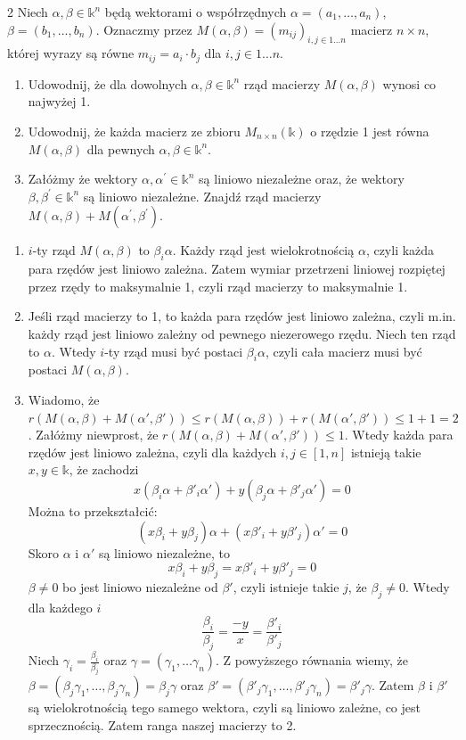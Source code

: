 \documentclass{../note}
\begin{document}
\begin{zadanie}{2}
    Niech $\alpha,\beta\in\mathbb{k}^{n}$ będą wektorami o współrzędnych $\alpha=(a_{1},\dots,a_{n})$, $\beta=(b_{1},\dots,b_{n})$. Oznaczmy przez $M(\alpha,\beta)=(m_{ij})_{i,j\in 1\dots n}$ macierz $n\times n$, której wyrazy są równe $m_{ij}=a_{i}\cdot b_{j}$ dla $i,j\in 1\dots n$.
\begin{enumerate}
    \item[(a)] Udowodnij, że dla dowolnych $\alpha,\beta\in\mathbb{k}^{n}$ rząd macierzy $M(\alpha,\beta)$ wynosi co najwyżej 1.
    \item[(b)] Udowodnij, że każda macierz ze zbioru $M_{n\times n}(\mathbb{k})$ o rzędzie 1 jest równa $M(\alpha,\beta)$ dla pewnych $\alpha,\beta\in\mathbb{k}^n$.
    \item[(c)] Załóżmy że wektory $\alpha,\alpha^{\prime}\in\mathbb{k}^{n}$ są liniowo niezależne oraz, że wektory $\beta, \beta^{\prime}\in\mathbb{k}^{n}$ są liniowo niezależne. Znajdź rząd macierzy $M(\alpha,\beta)+M(\alpha^{\prime},\beta^{\prime})$.
\end{enumerate}
\end{zadanie}
\begin{rozwiazanie}
\begin{enumerate}[label=(\alph*)]
    \item $i$-ty rząd $M(\alpha, \beta)$ to $\beta_i\alpha$. Każdy rząd jest wielokrotnością $\alpha$, czyli każda para rzędów jest liniowo zależna. Zatem wymiar przetrzeni liniowej rozpiętej przez rzędy to maksymalnie 1, czyli rząd macierzy to maksymalnie 1.
    \item Jeśli rząd macierzy to 1, to każda para rzędów jest liniowo zależna, czyli m.in. każdy rząd jest liniowo zależny od pewnego niezerowego rzędu. Niech ten rząd to $\alpha$. Wtedy $i$-ty rząd musi być postaci $\beta_i\alpha$, czyli cała macierz musi być postaci $M(\alpha, \beta)$.
    \item Wiadomo, że $r(M(\alpha, \beta) + M(\alpha', \beta')) \leq r(M(\alpha, \beta)) + r(M(\alpha', \beta')) \leq 1 + 1 = 2$. Załóżmy niewprost, że $r(M(\alpha, \beta) + M(\alpha', \beta')) \leq 1$. Wtedy każda para rzędów jest liniowo zależna, czyli dla każdych $i, j \in [1, n]$ istnieją takie $x, y \in \mathbb{k}$, że zachodzi
    \[x(\beta_i\alpha + \beta'_i\alpha') + y(\beta_j\alpha + \beta'_j\alpha') = 0\]
    Można to przekształcić:
    \[(x\beta_i + y\beta_j)\alpha + (x\beta'_i + y\beta'_j)\alpha' = 0\]
    Skoro $\alpha$ i $\alpha'$ są liniowo niezależne, to 
    \[x\beta_i + y\beta_j = x\beta'_i + y\beta'_j = 0\]
    $\beta \neq 0$ bo jest liniowo niezależne od $\beta'$, czyli istnieje takie $j$, że $\beta_j \neq 0$. Wtedy dla każdego $i$
    \[\frac{\beta_i}{\beta_j} = \frac{-y}{x} = \frac{\beta'_i}{\beta'_j}\]
    Niech $\gamma_i = \frac{\beta_i}{\beta_j}$ oraz $\gamma = (\gamma_1, \ldots \gamma_n)$. Z powyższego równania wiemy, że $\beta = (\beta_j\gamma_1, \ldots, \beta_j\gamma_n) = \beta_j\gamma$ oraz $\beta' = (\beta'_j\gamma_1, \ldots, \beta'_j\gamma_n) = \beta'_j\gamma$. Zatem $\beta$ i $\beta'$ są wielokrotnością tego samego wektora, czyli są liniowo zależne, co jest sprzecznością. Zatem ranga naszej macierzy to 2.
\end{enumerate}
\end{rozwiazanie}
\end{document}
